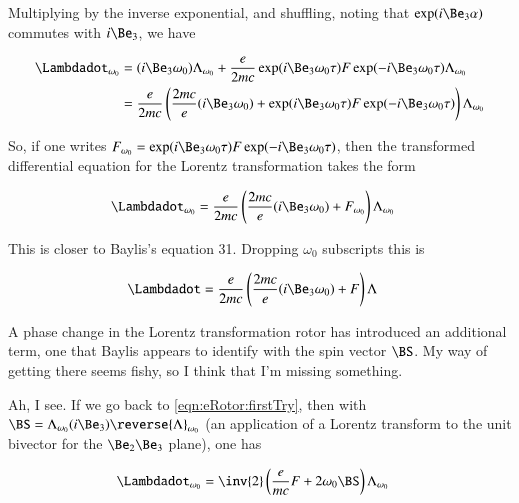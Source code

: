 Multiplying by the inverse exponential, and shuffling, noting that $\exp(i\Be_3\alpha)$ commutes with $i\Be_3$, we have

\begin{align*}
\Lambdadot_{\omega_0} 
&= 
( i \Be_3 \omega_0 ) \Lambda_{\omega_0} 
+ \frac{e}{2 m c} 
\exp( i \Be_3 \omega_0 \tau) 
F 
\exp( -i \Be_3 \omega_0 \tau)
\Lambda_{\omega_0}  \\
&=
\frac{e}{2 m c} \left(
\frac{2 m c}{e} ( i \Be_3 \omega_0 ) 
+ 
\exp( i \Be_3 \omega_0 \tau) 
F 
\exp( -i \Be_3 \omega_0 \tau)
\right)
\Lambda_{\omega_0} 
\end{align*}

So, if one writes $F_{\omega_0} = \exp( i \Be_3 \omega_0 \tau) F \exp( -i \Be_3 \omega_0 \tau)$, then
the transformed differential equation for the Lorentz transformation takes the form 

\begin{align*}
\Lambdadot_{\omega_0}
&=
\frac{e}{2 m c} \left(
\frac{2 m c}{e} ( i \Be_3 \omega_0 ) 
+ 
F_{\omega_0}
\right)
\Lambda_{\omega_0} 
\end{align*}

This is closer to Baylis's equation 31.
Dropping $\omega_0$ subscripts this is

\begin{align*}
\Lambdadot
&=
\frac{e}{2 m c} \left(
\frac{2 m c}{e} ( i \Be_3 \omega_0 ) 
+ 
F
\right)
\Lambda
\end{align*}

A phase change in the Lorentz transformation rotor has introduced an additional term, one that 
Baylis appears to identify with the spin vector $\BS$.  My way of getting there seems fishy, so I think that 
I'm missing something.

Ah, I see.  If we go back to \ref{eqn:eRotor:firstTry}, then with 
$\BS = \Lambda_{\omega_0} ( i \Be_3 ) \reverse{\Lambda}_{\omega_0}$ (an application of a Lorentz transform to the unit bivector for the $\Be_2 \Be_3$ plane), one has

\begin{align*}
\Lambdadot_{\omega_0} 
&= \inv{2} \left( \frac{e}{m c} F + 2 \omega_0 \BS \right) \Lambda_{\omega_0} 
\end{align*}
